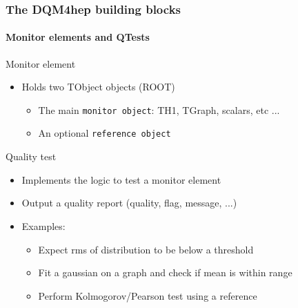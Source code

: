 \documentclass[presentation, 10pt]{beamer}
\begin{document}
\begin{frame}
  \frametitle{The DQM4hep building blocks}
  \framesubtitle{Monitor elements and QTests}
  \footnotesize
  \begin{block}{Monitor element}
    \begin{itemize}
      \item Holds two TObject objects (ROOT)
      \begin{itemize}
        \scriptsize
        \item The main \texttt{monitor object}: TH1, TGraph, scalars, etc ...
        \item An optional \texttt{reference object}
      \end{itemize}
    \end{itemize}
  \end{block}
  \begin{block}{Quality test}
    \begin{itemize}
      \item Implements the logic to test a monitor element
      \item Output a quality report (quality, flag, message, ...)
      \item Examples:
      \begin{itemize}
        \scriptsize
        \item Expect rms of distribution to be below a threshold
        \item Fit a gaussian on a graph and check if mean is within range
        \item Perform Kolmogorov/Pearson test using a reference
      \end{itemize}
    \end{itemize}
  \end{block}
\end{frame}
\end{document}
